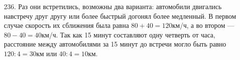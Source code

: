 236. Раз они встретились, возможны два варианта: автомобили двигались навстречу друг другу или более быстрый догонял более медленный. В первом случае скорость их сближения была равна $80+40=120$км/ч, а во втором --- $80-40=40$км/ч. Так как 15 минут составляют одну четверть от часа, расстояние между автомобилями за 15 минут до встречи могло быть равно $120:4=30$км или $40:4=10$км.\\
